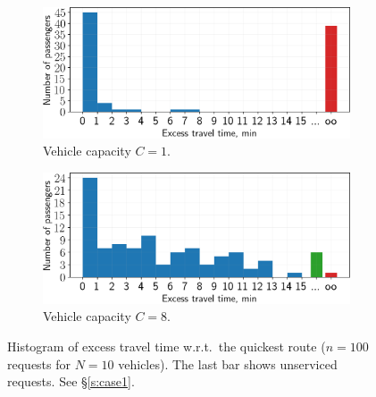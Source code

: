 \documentclass[12pt,notitlepage]{article}
\begin{document}
\begin{figure}[!p]
	
	\caption{%
		Passenger trajectories
		colored by excess travel time
		w.r.t.~the quickest route
		($n = 100$ requests for $N = 10$ vehicles).
		Empty red circles are unserviced pickup requests.
		Cf.~\S\ref{s:case1}.
	}
	\label{f:case1-traj}
	
	\vspace{2\baselineskip}
	
	\begin{subfigure}{0.5\textwidth}
		\includegraphics[width=\textwidth]{20210616-OPT1/c_grid_study0/UTC-20210619-074952/plots/8/excess_travel_time_hist}
		\caption{Vehicle capacity $C = 1$.}
	\end{subfigure}
	\begin{subfigure}{0.5\textwidth}
		\includegraphics[width=\textwidth]{20210616-OPT1/c_grid_study0/UTC-20210619-074952/plots/9/excess_travel_time_hist}
		
		\caption{Vehicle capacity $C = 8$.}
	\end{subfigure}
	
	\caption{%
		Histogram of excess travel time
		w.r.t.~the quickest route
		($n = 100$ requests for $N = 10$ vehicles).
		The last bar shows unserviced requests.
		See \S\ref{s:case1}.
	}
	\label{f:case1-hist}

	\vspace{2\baselineskip}
	

\end{figure}
\end{document}
